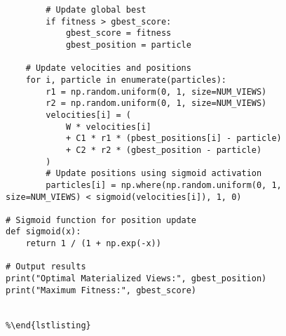 \begin{verbatim}
        # Update global best
        if fitness > gbest_score:
            gbest_score = fitness
            gbest_position = particle

    # Update velocities and positions
    for i, particle in enumerate(particles):
        r1 = np.random.uniform(0, 1, size=NUM_VIEWS)
        r2 = np.random.uniform(0, 1, size=NUM_VIEWS)
        velocities[i] = (
            W * velocities[i]
            + C1 * r1 * (pbest_positions[i] - particle)
            + C2 * r2 * (gbest_position - particle)
        )
        # Update positions using sigmoid activation
        particles[i] = np.where(np.random.uniform(0, 1, size=NUM_VIEWS) < sigmoid(velocities[i]), 1, 0)

# Sigmoid function for position update
def sigmoid(x):
    return 1 / (1 + np.exp(-x))

# Output results
print("Optimal Materialized Views:", gbest_position)
print("Maximum Fitness:", gbest_score)


%\end{lstlisting}
\end{verbatim}